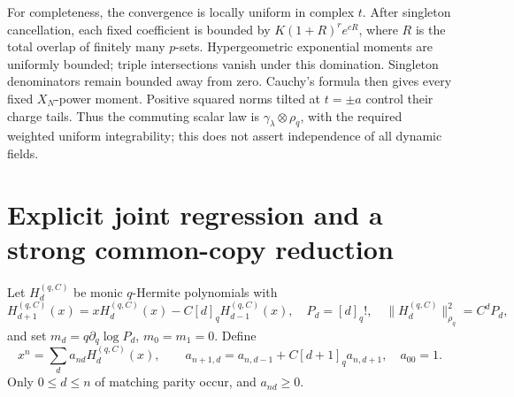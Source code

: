 \documentclass[11pt]{article}
\newcommand{\HH}{H^{(q,C)}}
\begin{document}
For completeness, the convergence is locally uniform in complex $t$.
After singleton cancellation, each fixed coefficient is bounded by
$K(1+R)^r e^{cR}$, where $R$ is the total overlap of finitely many
$p$-sets. Hypergeometric exponential moments are uniformly bounded;
triple intersections vanish under this domination. Singleton
denominators remain bounded away from zero. Cauchy's formula then
gives every fixed $X_N$-power moment. Positive squared norms tilted
at $t=\pm a$ control their charge tails. Thus the commuting scalar
law is $\gamma_\lambda\otimes\rho_q$, with the required weighted
uniform integrability; this does not assert independence of all
dynamic fields.

\newpage
\section{Explicit joint regression and a strong common-copy reduction}
Let $\HH_d$ be monic $q$-Hermite polynomials with
\begin{equation}
 \HH_{d+1}(x)=x\HH_d(x)-C[d]_q\HH_{d-1}(x),\quad
 P_d=[d]_q!,\quad \|\HH_d\|_{\rho_q}^2=C^dP_d,
\end{equation}
and set $m_d=q\partial_q\log P_d$, $m_0=m_1=0$. Define
\begin{equation}
 x^n=\sum_d a_{nd}\HH_d(x),\qquad
 a_{n+1,d}=a_{n,d-1}+C[d+1]_q a_{n,d+1},\quad a_{00}=1.
\end{equation}
Only $0\le d\le n$ of matching parity occur, and $a_{nd}\ge0$.
\end{document}
